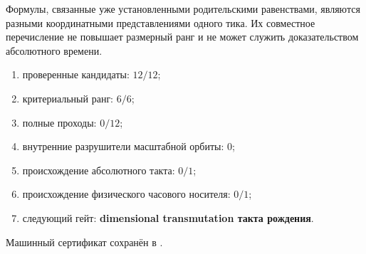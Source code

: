 \begin{nogocriterion}
Формулы, связанные уже установленными родительскими равенствами, являются
разными координатными представлениями одного тика. Их совместное перечисление
не повышает размерный ранг и не может служить доказательством абсолютного
времени.
\end{nogocriterion}

\begin{protocol}\begin{enumerate}
\item проверенные кандидаты: \textbf{$12/12$};
\item критериальный ранг: \textbf{$6/6$};
\item полные проходы: \textbf{$0/12$};
\item внутренние разрушители масштабной орбиты: \textbf{$0$};
\item происхождение абсолютного такта: \textbf{$0/1$};
\item происхождение физического часового носителя: \textbf{$0/1$};
\item следующий гейт: \textbf{dimensional transmutation такта рождения}.
\end{enumerate}\end{protocol}

Машинный сертификат сохранён в
.